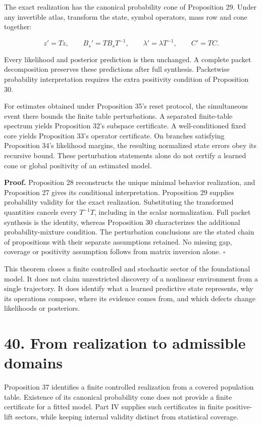\documentclass[11pt,letterpaper]{article}
\begin{document}
The exact realization has the canonical probability cone of Proposition
29. Under any invertible atlas, transform the state, symbol operators,
mass row and cone together:

\[
z'=Tz,\qquad B_s'=TB_sT^{-1},\qquad
\lambda'=\lambda T^{-1},\qquad C'=TC.
\]

Every likelihood and posterior prediction is then unchanged. A complete
packet decomposition preserves these predictions after full synthesis.
Packetwise probability interpretation requires the extra positivity
condition of Proposition 30.

For estimates obtained under Proposition 35's reset protocol, the
simultaneous event there bounds the finite table perturbations. A
separated finite-table spectrum yields Proposition 32's subspace
certificate. A well-conditioned fixed core yields Proposition 33's
operator certificate. On branches satisfying Proposition 34's likelihood
margins, the resulting normalized state errors obey its recursive bound.
These perturbation statements alone do not certify a learned cone or
global positivity of an estimated model.

\textbf{Proof.} Proposition 28 reconstructs the unique minimal behavior
realization, and Proposition 27 gives its conditional interpretation.
Proposition 29 supplies probability validity for the exact realization.
Substituting the transformed quantities cancels every \(T^{-1}T\),
including in the scalar normalization. Full packet synthesis is the
identity, whereas Proposition 30 characterizes the additional
probability-mixture condition. The perturbation conclusions are the
stated chain of propositions with their separate assumptions retained.
No missing gap, coverage or positivity assumption follows from matrix
inversion alone. \(\square\)

This theorem closes a finite controlled and stochastic sector of the
foundational model. It does not claim unrestricted discovery of a
nonlinear environment from a single trajectory. It does identify what a
learned predictive state represents, why its operations compose, where
its evidence comes from, and which defects change likelihoods or
posteriors.

\section{40. From realization to admissible
domains}\label{from-realization-to-admissible-domains}

Proposition 37 identifies a finite controlled realization from a covered
population table. Existence of its canonical probability cone does not
provide a finite certificate for a fitted model. Part IV supplies such
certificates in finite positive-lift sectors, while keeping internal
validity distinct from statistical coverage.
\end{document}
